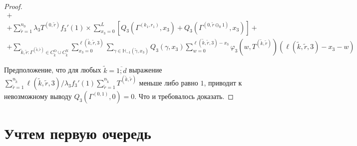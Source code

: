 \documentclass[a4paper,12pt,russian]{extarticle}
\begin{document}
\begin{proof}
\begin{multline}
 +\\+ \sum_{\tilde{r}=1}^{n_0} \lambda_3 T^{(0,\tilde{r})} f_3'(1)  \times \sum_{x_3=0}^{L} \left[ Q_3(\Gamma^{(k_1,r_1)},x_3) + Q_3(\Gamma^{(0,\tilde{r}\ominus_0 1)},x_3) \right]   +\\+  \sum_{\tilde{k},\tilde{r}\colon \Gamma^{(\tilde{k}, \tilde{r})} \in C_{\tilde{k}}^{\mathrm{O}}\cup C_{\tilde{k}}^{\mathrm{N}}} \sum_{x_3=0}^{\ell(\tilde{k},\tilde{r},3)}\sum_{\gamma \in {\mathbb H}_{-1}(\tilde{\gamma},x_3)} Q_3(\gamma,x_3) \sum_{w=0}^{\ell(\tilde{k},\tilde{r},3) - x_3} \varphi_3(w,T^{(\tilde{k},\tilde{r})}) (\ell(\tilde{k},\tilde{r},3)-x_3 - w)
 \label{neccessary:to:paste:one}
\end{multline}


Предположение, что для любых $\tilde{k}=\overline{1;d}$  выражение $\sum_{\tilde{r} = 1}^{n_{\tilde{k}}}\ell(\tilde{k},\tilde{r},3) \big/\lambda_3 f_3'(1) \sum_{\tilde{r} = 1}^{n_{\tilde{k}}} T^{(\tilde{k},\tilde{r})}   $ меньше либо равно $1$, приводит к невозможному выводу $Q_3(\Gamma^{(0,1)},0) = 0$. Что и требовалось доказать.

\end{proof}

















\section{Учтем первую очередь}
\end{document}
